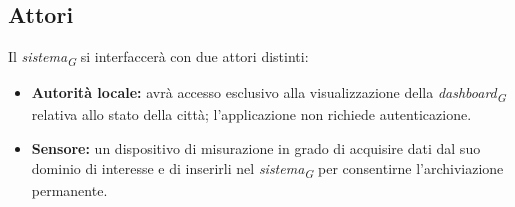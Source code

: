 \subsection{Attori}
Il \textit{sistema}\textsubscript{\textit{G}} si interfaccerà con due attori distinti:

\begin{itemize}
    \item \textbf{Autorità locale:} avrà accesso esclusivo alla visualizzazione della \textit{dashboard}\textsubscript{\textit{G}} relativa allo stato della città; l'applicazione non richiede autenticazione.  
    \item \textbf{Sensore:} un dispositivo di misurazione in grado di acquisire dati dal suo dominio di interesse e di inserirli nel \textit{sistema}\textsubscript{\textit{G}} per consentirne l'archiviazione permanente.  
\end{itemize}